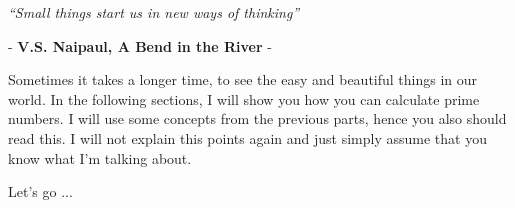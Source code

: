 \begin{center}
	\textit{“Small things start us in new ways of thinking” }
\end{center}
\begin{flushright}
	- \textbf{V.S. Naipaul, A Bend in the River} - 
\end{flushright}

Sometimes it takes a longer time, to see the easy and beautiful things in our world. In the following sections, I will show you how you can calculate prime numbers. I will use some concepts from the previous parts, hence you also should read this. I will not explain this points again and just simply assume that you know what I'm talking about.

\vspace{0.3cm}
Let's go ...
